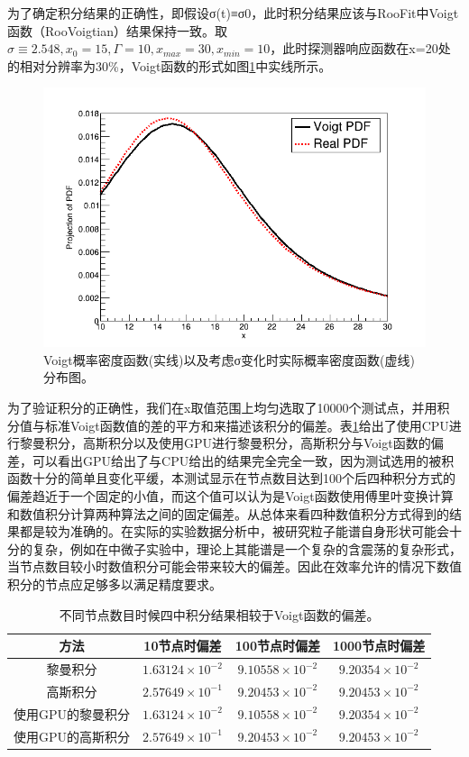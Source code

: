 为了确定积分结果的正确性，即假设σ(t)≡σ0，此时积分结果应该与RooFit中Voigt函数（RooVoigtian）结果保持一致。取$\sigma \equiv 2.548, x_0=15, \Gamma=10,x_{max}=30,x_{min}=10$，此时探测器响应函数在x=20处的相对分辨率为30\%，Voigt函数的形式如图\ref{fig:cuda_com}中实线所示。

\begin{figure}
    \centering
    \includegraphics[width=0.6\columnwidth]{pic/cuda1.png}
    \caption{ Voigt概率密度函数(实线)以及考虑σ变化时实际概率密度函数(虚线)分布图。}
    \label{fig:cuda_com}
\end{figure}

为了验证积分的正确性，我们在x取值范围上均匀选取了10000个测试点，并用积分值与标准Voigt函数值的差的平方和来描述该积分的偏差。表\ref{tab:cuda_dif}给出了使用CPU进行黎曼积分，高斯积分以及使用GPU进行黎曼积分，高斯积分与Voigt函数的偏差，可以看出GPU给出了与CPU给出的结果完全完全一致，因为测试选用的被积函数十分的简单且变化平缓，本测试显示在节点数目达到100个后四种积分方式的偏差趋近于一个固定的小值，而这个值可以认为是Voigt函数使用傅里叶变换计算和数值积分计算两种算法之间的固定偏差。从总体来看四种数值积分方式得到的结果都是较为准确的。在实际的实验数据分析中，被研究粒子能谱自身形状可能会十分的复杂，例如在中微子实验中，理论上其能谱是一个复杂的含震荡的复杂形式，当节点数目较小时数值积分可能会带来较大的偏差。因此在效率允许的情况下数值积分的节点应足够多以满足精度要求。

\begin{table}
    \centering
    \begin{tabular*}{\textwidth}{@{\extracolsep{\fill}}cccc}
        \hline
        \hline							
        方法	&	10节点时偏差	&	100节点时偏差	&	1000节点时偏差	\\\hline
        黎曼积分	&	$1.63124\times10^{-2}$	&	$9.10558\times10^{-2}$	&	$9.20354\times10^{-2}$	\\
        高斯积分	&	$2.57649\times10^{-1}$	&	$9.20453\times10^{-2}$	&	$9.20453\times10^{-2}$	\\
        使用GPU的黎曼积分	&	$1.63124\times10^{-2}$	&	$9.10558\times10^{-2}$	&	$9.20354\times10^{-2}$	\\
        使用GPU的高斯积分	&	$2.57649\times10^{-1}$	&	$9.20453\times10^{-2}$	&	$9.20453\times10^{-2}$	\\
        \hline
        \hline
    \end{tabular*}
    \caption{不同节点数目时候四中积分结果相较于Voigt函数的偏差。}
    \label{tab:cuda_dif}
\end{table}

